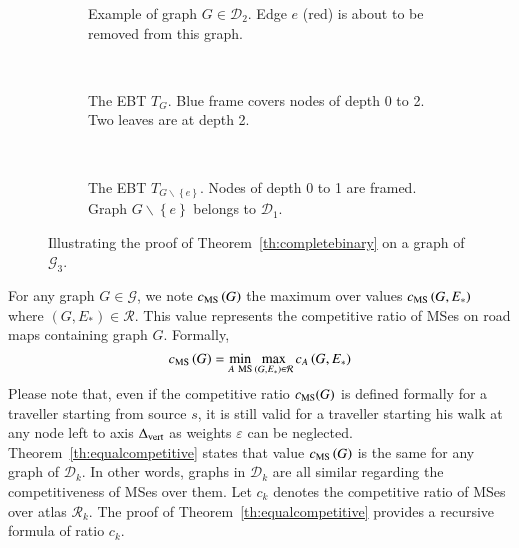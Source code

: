 \documentclass[preprint]{elsarticle}
\newcommand{\set}[1]{\left\{ #1 \right\}}
\newcommand{\mcalg}{\mathcal{G}}
\newcommand{\mcalr}{\mathcal{R}}
\newcommand{\mcald}{\mathcal{D}}
\newcommand{\mts}{MS}
\newcommand{\deltavert}{\Delta_{\mbox{\scriptsize{vert}}}}
\newcommand{\cms}{c_{\mbox{\scriptsize{MS}}}}
\begin{document}
\begin{figure}[h]
\centering
\begin{subfigure}[b]{0.3\columnwidth}
\centering
\scalebox{.40}{}
\caption{Example of graph $G \in \mcald_2$. Edge $e$ (red) is about to be removed from this graph.}
\label{subfig:proofth1_a}
\end{subfigure}
~
\begin{subfigure}[b]{0.3\columnwidth}
\centering
\scalebox{.55}{}
\caption{The EBT $T_{G}$. Blue frame covers nodes of depth 0 to 2. Two leaves are at depth 2.}
\label{subfig:proofth1_b}
\end{subfigure}
~
\begin{subfigure}[b]{0.3\columnwidth}
\centering
\scalebox{.55}{}
\caption{The EBT $T_{G \backslash \set{e}}$. Nodes of depth 0 to 1 are framed. Graph $G\backslash \set{e}$ belongs to $\mcald_1$.}
\label{subfig:proofth1_c}
\end{subfigure}
\caption{Illustrating the proof of Theorem~\ref{th:completebinary} on a graph of $\mcalg_3$.}
\label{fig:proofth1}
\end{figure}


For any graph $G \in \mcalg$, we note $\cms\left(G\right)$ the maximum over values $\cms\left(G,E_*\right)$ where $\left(G,E_*\right) \in \mcalr$. This value represents the competitive ratio of \mts es on road maps containing graph $G$. Formally, 
\begin{equation}
\cms\left(G\right) = \min\limits_{A ~\mbox{\scriptsize {MS}}} \max\limits_{\left(G,E_*\right) \in \mcalr} c_A\left(G,E_*\right)
\label{eq:cmsg}
\end{equation}
Please note that, even if the competitive ratio $\cms(G)$ is defined formally for a traveller starting from source $s$, it is still valid for a traveller starting his walk at any node left to axis $\deltavert$ as weights $\varepsilon$ can be neglected. Theorem~\ref{th:equalcompetitive} states that value $\cms\left(G\right)$ is the same for any graph of $\mcald_k$. In other words, graphs in $\mcald_k$ are all similar regarding the competitiveness of \mts es over them. Let $c_k$ denotes the competitive ratio of \mts es over atlas $\mcalr_k$. The proof of Theorem~\ref{th:equalcompetitive} provides a recursive formula of ratio $c_k$.
\end{document}
